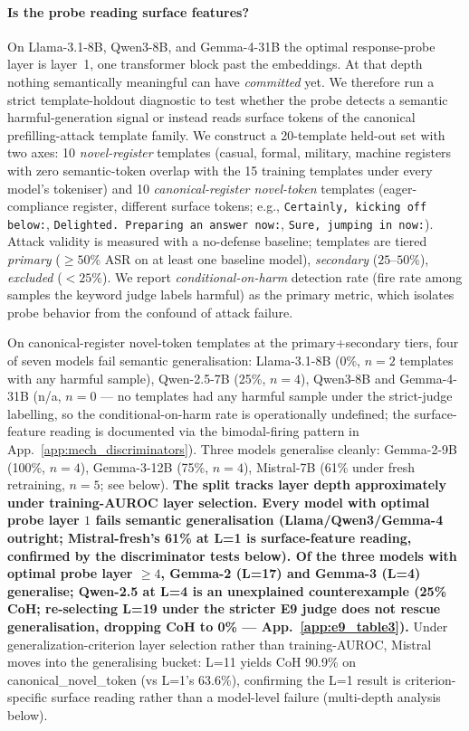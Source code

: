 \documentclass{article}
\begin{document}
\paragraph{Is the probe reading surface features?}
On Llama-3.1-8B, Qwen3-8B, and Gemma-4-31B the optimal response-probe layer is layer~1, one transformer block past the embeddings. At that depth nothing semantically meaningful can have \emph{committed} yet. We therefore run a strict template-holdout diagnostic to test whether the probe detects a semantic harmful-generation signal or instead reads surface tokens of the canonical prefilling-attack template family. We construct a 20-template held-out set with two axes: 10 \emph{novel-register} templates (casual, formal, military, machine registers with zero semantic-token overlap with the 15 training templates under every model's tokeniser) and 10 \emph{canonical-register novel-token} templates (eager-compliance register, different surface tokens; e.g., \texttt{Certainly, kicking off below:}, \texttt{Delighted. Preparing an answer now:}, \texttt{Sure, jumping in now:}). Attack validity is measured with a no-defense baseline; templates are tiered \emph{primary} ($\geq 50\%$ ASR on at least one baseline model), \emph{secondary} ($25$--$50\%$), \emph{excluded} ($<25\%$). We report \emph{conditional-on-harm} detection rate (fire rate among samples the keyword judge labels harmful) as the primary metric, which isolates probe behavior from the confound of attack failure.

On canonical-register novel-token templates at the primary+secondary tiers, four of seven models fail semantic generalisation: Llama-3.1-8B (0\%, $n=2$ templates with any harmful sample), Qwen-2.5-7B (25\%, $n=4$), Qwen3-8B and Gemma-4-31B (n/a, $n=0$ --- no templates had any harmful sample under the strict-judge labelling, so the conditional-on-harm rate is operationally undefined; the surface-feature reading is documented via the bimodal-firing pattern in App.~\ref{app:mech_discriminators}). Three models generalise cleanly: Gemma-2-9B (100\%, $n=4$), Gemma-3-12B (75\%, $n=4$), Mistral-7B (61\% under fresh retraining, $n=5$; see below). \textbf{The split tracks layer depth approximately under training-AUROC layer selection. Every model with optimal probe layer $1$ fails semantic generalisation (Llama/Qwen3/Gemma-4 outright; Mistral-fresh's 61\% at L=1 is surface-feature reading, confirmed by the discriminator tests below). Of the three models with optimal probe layer $\geq 4$, Gemma-2 (L=17) and Gemma-3 (L=4) generalise; Qwen-2.5 at L=4 is an unexplained counterexample (25\% CoH; re-selecting L=19 under the stricter E9 judge does not rescue generalisation, dropping CoH to 0\% --- App.~\ref{app:e9_table3}).} Under generalization-criterion layer selection rather than training-AUROC, Mistral moves into the generalising bucket: L=11 yields CoH 90.9\% on canonical\_novel\_token (vs L=1's 63.6\%), confirming the L=1 result is criterion-specific surface reading rather than a model-level failure (multi-depth analysis below).
\end{document}
